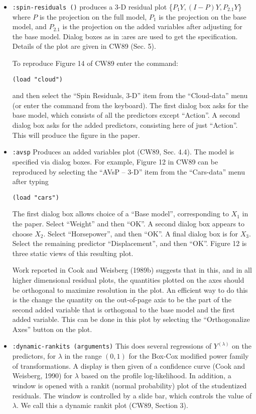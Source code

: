 \begin{itemize}
\item {\tt :spin-residuals ()} produces a 3-D residual plot 
\{$P_1Y, (I-P)Y, P_{2.1}Y$\} 
where $P$ is the projection on the full model, $P_1$ is the projection on the 
base model, and $P_{2.1}$ is the projection on the added variables after 
adjusting for the base model.  Dialog boxes as in :ares are used to get the
specification.  Details of the plot are given in CW89 (Sec.  5).

To reproduce Figure 14 of CW89 enter the command:
\begin{verbatim}
(load "cloud")
\end{verbatim}
and then select the ``Spin Residuals, 3-D'' item from the ``Cloud-data'' 
menu (or
enter the command from the keyboard).  The first dialog box asks for the base
model, which consists of all the predictors except ``Action''.  A second
dialog box asks for the added predictors, consisting here of just ``Action''.
This will produce the figure in the paper.

\item {\tt :avsp}  Produces an added variables plot (CW89, Sec. 4.4).
The model is specified via dialog boxes.  For example, Figure 12 in
CW89 can be reproduced by selecting the ``AVsP -- 3-D'' item from the 
``Cars-data'' menu after typing
\begin{verbatim}
(load "cars")
\end{verbatim}
The first dialog box allows choice of a ``Base model'', corresponding to $X_1$
in the paper.  Select ``Weight'' 
and then ``OK''.  A second dialog box appears to choose $X_2$.
Select ``Horsepower'', and then ``OK''.  A final dialog box is for $X_3$.
Select the remaining predictor ``Displacement'', and then ``OK''.  Figure 12
is three static views of this resulting plot.

Work reported in Cook and Weisberg (1989b) suggests that in this, 
and in all higher
dimensional residual plots, the quantities plotted on the axes should be
orthogonal to maximize resolution in the plot.  An efficient way to do this is
the change the quantity on the out-of-page axis to be the part of the second
added variable that is orthogonal to the base model and the first added
variable.  This can be done in this plot by selecting the
``Orthogonalize Axes'' button on the plot.

\item {\tt :dynamic-rankits (arguments)}
This does several regressions of
$Y^{(\lambda)}$ on the predictors, for $\lambda$ in the range $(0, 1)$ for
the Box-Cox modified power family of transformations.  
A display is then 
given of a confidence curve (Cook and Weisberg, 1990) for $\lambda$ 
based on the profile log-likelihood.  
In addition, a window is opened with a rankit (normal probability)
plot of the studentized 
residuals.   The window is controlled by a slide bar, which controls the 
value of $\lambda$.  We call this a dynamic rankit plot (CW89, Section 3).


\end{itemize}
